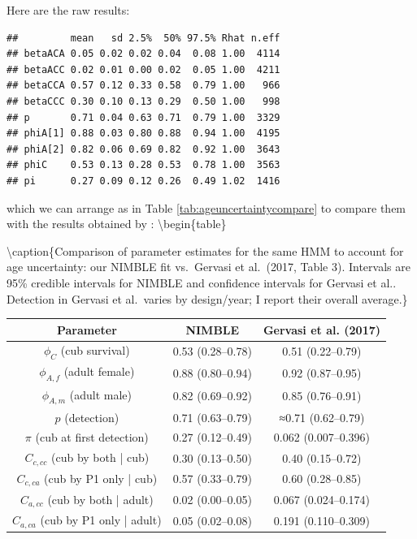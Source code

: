\documentclass[
  12pt,
]{krantz}
\begin{document}
Here are the raw results:

\begin{verbatim}
##         mean   sd 2.5%  50% 97.5% Rhat n.eff
## betaACA 0.05 0.02 0.02 0.04  0.08 1.00  4114
## betaACC 0.02 0.01 0.00 0.02  0.05 1.00  4211
## betaCCA 0.57 0.12 0.33 0.58  0.79 1.00   966
## betaCCC 0.30 0.10 0.13 0.29  0.50 1.00   998
## p       0.71 0.04 0.63 0.71  0.79 1.00  3329
## phiA[1] 0.88 0.03 0.80 0.88  0.94 1.00  4195
## phiA[2] 0.82 0.06 0.69 0.82  0.92 1.00  3643
## phiC    0.53 0.13 0.28 0.53  0.78 1.00  3563
## pi      0.27 0.09 0.12 0.26  0.49 1.02  1416
\end{verbatim}

which we can arrange as in Table \ref{tab:ageuncertaintycompare} to compare them with the results obtained by \citet{Gervasi2017}:
\textbackslash begin\{table\}

\textbackslash caption\{\label{tab:ageuncertaintycompare}Comparison of parameter estimates for the same HMM to account for age uncertainty: our NIMBLE fit vs.~Gervasi et al.~(2017, Table 3). Intervals are 95\% credible intervals for NIMBLE and confidence intervals for Gervasi et al.. Detection in Gervasi et al.~varies by design/year; I report their overall average.\}
\centering

\begin{tabular}[t]{c|c|c}
\hline
Parameter & NIMBLE & Gervasi et al. (2017)\\
\hline
$\phi_C$ (cub survival) & 0.53 (0.28–0.78) & 0.51 (0.22–0.79)\\
\hline
$\phi_{A,f}$ (adult female) & 0.88 (0.80–0.94) & 0.92 (0.87–0.95)\\
\hline
$\phi_{A,m}$ (adult male) & 0.82 (0.69–0.92) & 0.85 (0.76–0.91)\\
\hline
$p$ (detection) & 0.71 (0.63–0.79) & ≈0.71 (0.62–0.79)\\
\hline
$\pi$ (cub at first detection) & 0.27 (0.12–0.49) & 0.062 (0.007–0.396)\\
\hline
$C_{c,cc}$ (cub by both | cub) & 0.30 (0.13–0.50) & 0.40 (0.15–0.72)\\
\hline
$C_{c,ca}$ (cub by P1 only | cub) & 0.57 (0.33–0.79) & 0.60 (0.28–0.85)\\
\hline
$C_{a,cc}$ (cub by both | adult) & 0.02 (0.00–0.05) & 0.067 (0.024–0.174)\\
\hline
$C_{a,ca}$ (cub by P1 only | adult) & 0.05 (0.02–0.08) & 0.191 (0.110–0.309)\\
\hline
\end{tabular}
\end{document}
